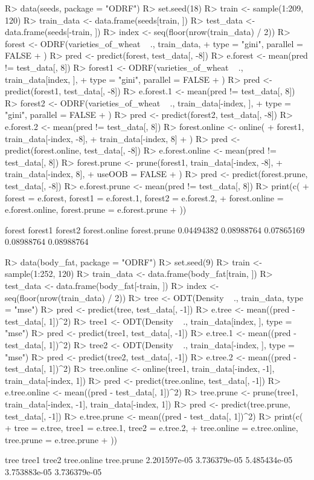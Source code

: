 \documentclass[nojss]{jss}
\numberwithin{equation}{section}
\begin{document}
\begin{Schunk}
\begin{Sinput}
R> data(seeds, package = "ODRF")
R> set.seed(18)
R> train <- sample(1:209, 120)
R> train_data <- data.frame(seeds[train, ])
R> test_data <- data.frame(seeds[-train, ])
R> index <- seq(floor(nrow(train_data) / 2))
R> forest <- ODRF(varieties_of_wheat ~ ., train_data,
+    type = "gini", parallel = FALSE
+  )
R> pred <- predict(forest, test_data[, -8])
R> e.forest <- mean(pred != test_data[, 8])
R> forest1 <- ODRF(varieties_of_wheat ~ ., train_data[index, ],
+    type = "gini", parallel = FALSE
+  )
R> pred <- predict(forest1, test_data[, -8])
R> e.forest.1 <- mean(pred != test_data[, 8])
R> forest2 <- ODRF(varieties_of_wheat ~ ., train_data[-index, ],
+    type = "gini", parallel = FALSE
+  )
R> pred <- predict(forest2, test_data[, -8])
R> e.forest.2 <- mean(pred != test_data[, 8])
R> forest.online <- online(
+    forest1, train_data[-index, -8],
+    train_data[-index, 8]
+  )
R> pred <- predict(forest.online, test_data[, -8])
R> e.forest.online <- mean(pred != test_data[, 8])
R> forest.prune <- prune(forest1, train_data[-index, -8],
+    train_data[-index, 8],
+    useOOB = FALSE
+  )
R> pred <- predict(forest.prune, test_data[, -8])
R> e.forest.prune <- mean(pred != test_data[, 8])
R> print(c(
+    forest = e.forest, forest1 = e.forest.1, forest2 = e.forest.2,
+    forest.online = e.forest.online, forest.prune = e.forest.prune
+  ))
\end{Sinput}
\begin{Soutput}
       forest       forest1       forest2 forest.online  forest.prune 
   0.04494382    0.08988764    0.07865169    0.08988764    0.08988764 
\end{Soutput}
\begin{Sinput}
R> data(body_fat, package = "ODRF")
R> set.seed(9)
R> train <- sample(1:252, 120)
R> train_data <- data.frame(body_fat[train, ])
R> test_data <- data.frame(body_fat[-train, ])
R> index <- seq(floor(nrow(train_data) / 2))
R> tree <- ODT(Density ~ ., train_data, type = "mse")
R> pred <- predict(tree, test_data[, -1])
R> e.tree <- mean((pred - test_data[, 1])^2)
R> tree1 <- ODT(Density ~ ., train_data[index, ], type = "mse")
R> pred <- predict(tree1, test_data[, -1])
R> e.tree.1 <- mean((pred - test_data[, 1])^2)
R> tree2 <- ODT(Density ~ ., train_data[-index, ], type = "mse")
R> pred <- predict(tree2, test_data[, -1])
R> e.tree.2 <- mean((pred - test_data[, 1])^2)
R> tree.online <- online(tree1, train_data[-index, -1], train_data[-index, 1])
R> pred <- predict(tree.online, test_data[, -1])
R> e.tree.online <- mean((pred - test_data[, 1])^2)
R> tree.prune <- prune(tree1, train_data[-index, -1], train_data[-index, 1])
R> pred <- predict(tree.prune, test_data[, -1])
R> e.tree.prune <- mean((pred - test_data[, 1])^2)
R> print(c(
+    tree = e.tree, tree1 = e.tree.1, tree2 = e.tree.2,
+    tree.online = e.tree.online, tree.prune = e.tree.prune
+  ))
\end{Sinput}
\begin{Soutput}
        tree        tree1        tree2  tree.online   tree.prune 
2.201597e-05 3.736379e-05 5.485434e-05 3.753883e-05 3.736379e-05 
\end{Soutput}
\end{Schunk}
\end{document}
